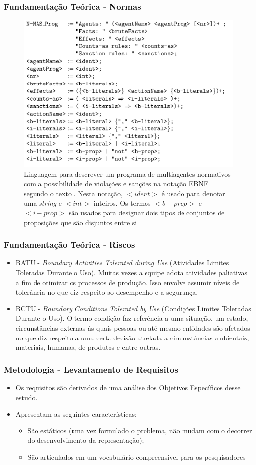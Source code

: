 \documentclass{beamer}
\begin{document}
\begin{frame}
	\frametitle{Fundamentação Teórica - Normas}
	\begin{figure}[H]
	  \centering
	  \includegraphics[width=0.5\linewidth]{figure/masprogram.png} 
	  \caption{Linguagem para descrever um programa de multiagentes normativos com a possibilidade de violações e sanções na notação EBNF segundo o texto \cite{dastaniframework}. Nesta notação, $<ident>$ é usado para denotar uma \textit{string} e $<int>$ inteiros. Os termos $<b-prop>$ e $<i-prop>$ são usados para designar dois tipos de conjuntos de proposições que são disjuntos entre si}
	  \label{descreveprograma}
	\end{figure}
\end{frame}


\begin{frame}
	\frametitle{Fundamentação Teórica - Riscos}
	\begin{itemize}
		\item BATU - \textit{Boundary Activities Tolerated during Use} (Atividades Limites Toleradas Durante o Uso). Muitas vezes a equipe adota atividades paliativas a fim de otimizar os processos de produção. Isso envolve assumir níveis de tolerância no que diz respeito ao desempenho e a segurança. 
		\item BCTU - \textit{Boundary Conditions Tolerated by Use} (Condições Limites Toleradas Durante o Uso). O termo condição faz referência a uma situação, um estado, circunstâncias externas às quais pessoas ou até mesmo entidades são afetados no que diz respeito a uma certa decisão atrelada a circunstâncias ambientais, materiais, humanas, de produtos e entre outras.
	\end{itemize}
\end{frame}

\begin{frame}
	\frametitle{Metodologia - Levantamento de Requisitos}
	\begin{itemize}
		\item Os requisitos são derivados de uma análise dos Objetivos Específicos desse estudo.
		\item Apresentam as seguintes características; 
		\begin{itemize}
			\item São estáticos (uma vez formulado o problema, não mudam com o decorrer do desenvolvimento da representação);
			\item São articulados em um vocabulário compreensível para os pesquisadores			
		\end{itemize}
	\end{itemize}
\end{frame}
\end{document}
